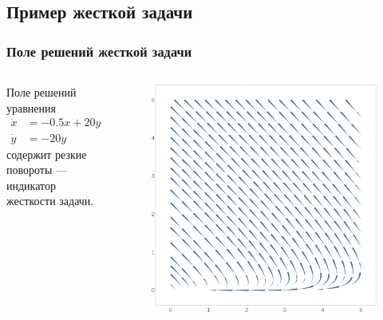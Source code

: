 \documentclass[professionalfonts,compress,unicode,aspectratio=169]{beamer}
\begin{document}
\subsection{Пример жесткой задачи}
\begin{frame}\frametitle{Поле решений жесткой задачи}
	\begin{columns}[T]
	\begin{column}{.5\textwidth}
	\vspace{1in}
	Поле решений уравнения
	\begin{align*}
	\dot x &= -0.5 x + 20 y\\
	\dot y &= -20 y
	\end{align*}
	содержит резкие повороты --- индикатор жесткости задачи.
	\vspace{1in}
	\end{column}
	\begin{column}{.5\textwidth}
	\begin{figure}%
	\includegraphics[height=.75\textheight]{stiff.pdf}%
	\end{figure}
	\end{column}
	\end{columns}
\end{frame}
\end{document}

